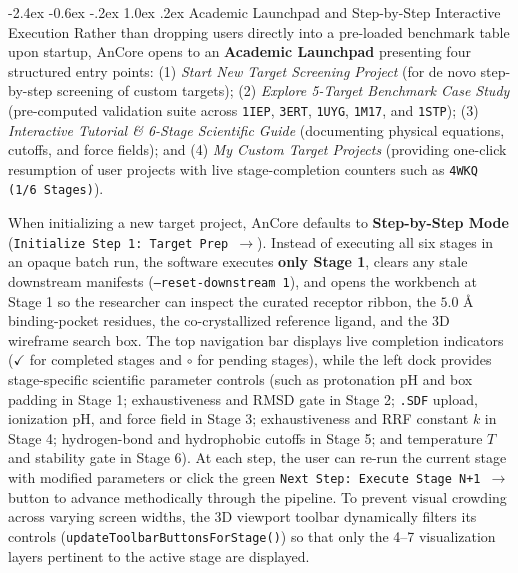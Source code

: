 \documentclass[11pt,a4paper]{article}
\makeatletter
\renewcommand{\subsection}{\@startsection{subsection}{2}{\z@}%
  {-2.4ex \@plus -0.6ex \@minus -.2ex}%
  {1.0ex \@plus .2ex}%
  {\normalfont\large\bfseries\color{primary}}}
\makeatother
\begin{document}
\subsection{Academic Launchpad and Step-by-Step Interactive Execution}
\noindent Rather than dropping users directly into a pre-loaded benchmark table upon startup, AnCore opens to an \textbf{Academic Launchpad} presenting four structured entry points: (1) \textit{Start New Target Screening Project} (for de novo step-by-step screening of custom targets); (2) \textit{Explore 5-Target Benchmark Case Study} (pre-computed validation suite across \texttt{1IEP}, \texttt{3ERT}, \texttt{1UYG}, \texttt{1M17}, and \texttt{1STP}); (3) \textit{Interactive Tutorial \& 6-Stage Scientific Guide} (documenting physical equations, cutoffs, and force fields); and (4) \textit{My Custom Target Projects} (providing one-click resumption of user projects with live stage-completion counters such as \texttt{4WKQ (1/6 Stages)}).

When initializing a new target project, AnCore defaults to \textbf{Step-by-Step Mode} (\texttt{Initialize Step 1: Target Prep $\rightarrow$}). Instead of executing all six stages in an opaque batch run, the software executes \textbf{only Stage 1}, clears any stale downstream manifests (\texttt{--reset-downstream 1}), and opens the workbench at Stage 1 so the researcher can inspect the curated receptor ribbon, the $5.0\text{ \AA}$ binding-pocket residues, the co-crystallized reference ligand, and the 3D wireframe search box. The top navigation bar displays live completion indicators ($\checkmark$ for completed stages and $\circ$ for pending stages), while the left dock provides stage-specific scientific parameter controls (such as protonation pH and box padding in Stage 1; exhaustiveness and RMSD gate in Stage 2; \texttt{.SDF} upload, ionization pH, and force field in Stage 3; exhaustiveness and RRF constant $k$ in Stage 4; hydrogen-bond and hydrophobic cutoffs in Stage 5; and temperature $T$ and stability gate in Stage 6). At each step, the user can re-run the current stage with modified parameters or click the green \texttt{Next Step: Execute Stage N+1 $\rightarrow$} button to advance methodically through the pipeline. To prevent visual crowding across varying screen widths, the 3D viewport toolbar dynamically filters its controls (\texttt{updateToolbarButtonsForStage()}) so that only the 4--7 visualization layers pertinent to the active stage are displayed.
\end{document}
